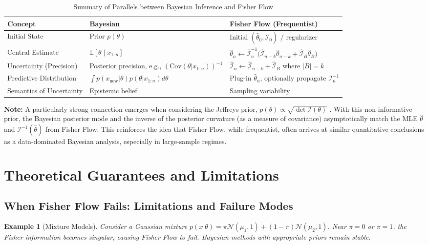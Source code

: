 \documentclass[11pt]{article}
\newtheorem{example}[theorem]{Example}
\begin{document}
\begin{table}[h!]
\centering
\begin{tabular}{l m{4.2cm} m{5.8cm}} 
\toprule
Concept & Bayesian & Fisher Flow (Frequentist) \\
\midrule
Initial State & Prior $p(\theta)$ & Initial $(\hat\theta_0, \mathcal{I}_0)$ / regularizer \\
Central Estimate & $\mathbb E[\theta\mid x_{1:n}]$ & $\hat\theta_{n} \leftarrow \hat{\mathcal I}_{n}^{-1}\bigl(\hat{\mathcal I}_{n-k}\hat\theta_{n-k} + \hat{\mathcal I}_{B}\hat\theta_{B}\bigr)$ \\
Uncertainty (Precision) & Posterior precision, e.g., $(\text{Cov}(\theta|x_{1:n}))^{-1}$ & $\hat{\mathcal I}_{n} \leftarrow \hat{\mathcal I}_{n-k} + \hat{\mathcal I}_{B}$ where $|B|=k$ \\
Predictive Distribution & $\int p(x_{\text{new}}|\theta)p(\theta|x_{1:n})d\theta$ & Plug-in $\hat\theta_n$, optionally propagate $\mathcal{I}_n^{-1}$ \\
Semantics of Uncertainty & Epistemic belief & Sampling variability \\
\bottomrule
\end{tabular}
\caption{Summary of Parallels between Bayesian Inference and Fisher Flow}
\label{tab:bayes_lpi_parallels}
\end{table}

\textbf{Note:} A particularly strong connection emerges when considering the Jeffreys prior, $p(\theta)\propto\sqrt{\det\mathcal I(\theta)}$ \cite{jeffreys1939theory, robert2007bayesian}. With this non-informative prior, the Bayesian posterior mode and the inverse of the posterior curvature (as a measure of covariance) asymptotically match the MLE $\hat{\theta}$ and $\mathcal{I}^{-1}(\hat{\theta})$ from Fisher Flow. This reinforces the idea that Fisher Flow, while frequentist, often arrives at similar quantitative conclusions as a data-dominated Bayesian analysis, especially in large-sample regimes.

\section{Theoretical Guarantees and Limitations}

\subsection{When Fisher Flow Fails: Limitations and Failure Modes}

\begin{example}[Mixture Models]
Consider a Gaussian mixture $p(x|\theta) = \pi \mathcal{N}(\mu_1, 1) + (1-\pi)\mathcal{N}(\mu_2, 1)$. Near $\pi = 0$ or $\pi = 1$, the Fisher information becomes singular, causing Fisher Flow to fail. Bayesian methods with appropriate priors remain stable.
\end{example}
\end{document}
